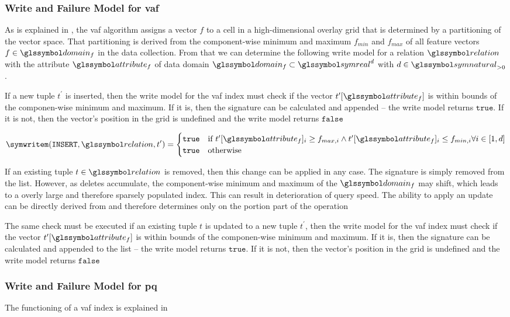 \subsubsection{Write and Failure Model for \texorpdfstring{\acrfull{vaf}}{VAF}}

As is explained in , the \acrshort{vaf} algorithm assigns a vector $f$ to a cell in a high-dimensional overlay grid that is determined by a partitioning of the vector space. That partitioning is derived from the component-wise minimum and maximum $f_{min}$ and $f_{max}$ of all feature vectors $f \in \domain_f$ in the data collection. From that we can determine the following write model for a relation $\relation$ with the attribute $\attribute_f$ of data domain $\domain_f \subset \symreal^d$ with $d \in \symnatural_{>0}$.

If a new tuple $t^{\prime}$ is inserted, then the write model for the \acrshort{vaf} index must check if the vector $t^{\prime}[\attribute_f]$ is within bounds of the componen-wise minimum and maximum. If it is, then the signature can be calculated and appended -- the write model returns $\mathtt{true}$. If it is not, then the vector's position in the grid is undefined and the write model returns $\mathtt{false}$

\begin{equation}
    \symwritem(\mathtt{INSERT}, \relation, t^{\prime}) =
    \begin{cases}
        \mathtt{true} & \text{if } t^{\prime}[\attribute_f]_i \geq f_{max,i} \wedge t^{\prime}[\attribute_f]_i \leq f_{min,i} \forall i \in [1,d]\\
        \mathtt{true} & \text{otherwise}
    \end{cases}
\end{equation}

If an existing tuple $t \in \relation$ is removed, then this change can be applied in any case. The signature is simply removed from the list. However, as deletes accumulate, the component-wise minimum and maximum of the $\domain_f$ may shift, which leads to a overly large and therefore sparsely populated index. This can result in deterioration of query speed. The ability to apply an update can be directly derived from  and therefore determines only on the portion part of the operation

The same check must be executed if an existing tuple $t$ is updated to a new tuple $t^{\prime}$, then the write model for the \acrshort{vaf} index must check if the vector $t^{\prime}[\attribute_f]$ is within bounds of the componen-wise minimum and maximum. If it is, then the signature can be calculated and appended to the list -- the write model returns $\mathtt{true}$. If it is not, then the vector's position in the grid is undefined and the write model returns $\mathtt{false}$

\subsubsection{Write and Failure Model for \texorpdfstring{\acrfull{pq}}{PQ}}
The functioning of a \acrshort{vaf} index is explained in 